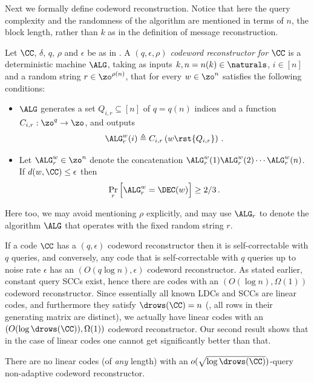 Next we formally define codeword reconstruction. Notice that here the
query complexity and the randomness of the algorithm are mentioned in
terms of $n$, the block length, rather than $k$ as in the definition of message reconstruction.

\begin{definition} \label{def:cod_recon}

Let $\CC$, $\delta$, $q$, $\rho$ and $\epsilon$ be as in .
A \emph{$(q,\epsilon, \rho)$ codeword reconstructor for $\CC$} is a deterministic machine $\ALG$, taking as inputs $k,n=n(k) \in \naturals$, $i\in [n]$ and a random string $r \in \zo^{\rho(n)}$, that for every $w \in \zo^n$ satisfies the following conditions:
\begin{itemize}
\item $\ALG$ generates a set $Q_{i,r} \subseteq [n]$ of $q=q(n)$ indices and a function $C_{i,r}:\zo^q \to \zo$, and outputs
\[
\ALG^w_r(i) \triangleq C_{i,r}\left(w\rst{Q_{i,r}}\right)\,.
\]
\item Let $\ALG^w_r \in \zo^n$ denote the concatenation $\ALG^w_r(1)
  \ALG^w_r(2)  \cdots  \ALG^w_r(n)$. If $d(w,\CC) \leq \epsilon$ then
\[
\Pr_r\Big[\ALG^w_r = \DEC(w)\Big] \geq 2/3\,.
\]
\end{itemize}
Here too, we may avoid mentioning $\rho$ explicitly, and may use $\ALG_r$ to denote the algorithm $\ALG$ that operates with the fixed random string $r$.
\end{definition}

If a code $\CC$ has a $(q,\epsilon)$ codeword reconstructor then it is self-correctable with $q$ queries, and conversely, any code that is self-correctable with $q$ queries up to noise rate $\epsilon$ has an $(O(q \log n),\epsilon)$ codeword reconstructor.
As stated earlier, constant query SCCs exist, hence there are codes with an $(O(\log n),\Omega(1))$ codeword reconstructor. Since essentially all known LDCs and SCCs are linear codes, and furthermore they satisfy $\drows(\CC) = n$ (\ie, all rows in their generating matrix are distinct), we actually have linear codes with an $(O(\log \drows(\CC)),\Omega(1))$ codeword reconstructor.  Our second result shows that in the case of linear codes one cannot get significantly better than that.

\begin{theorem}\label{theo:cdw}
There are no linear codes (of \emph{any} length) with an $o(\sqrt{\log \drows(\CC)})$-query non-adaptive codeword reconstructor.
\end{theorem}


